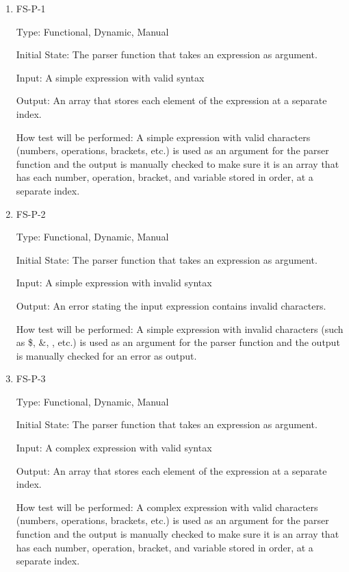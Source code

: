 \documentclass[12pt, titlepage]{article}
\begin{document}
\begin{enumerate}

\item{FS-P-1}

Type: Functional, Dynamic, Manual
					
Initial State: The parser function that takes an expression as argument.
					
Input: A simple expression with valid syntax
					
Output: An array that stores each element of the expression at a separate index.
					
How test will be performed: A simple expression with valid characters (numbers, operations, brackets, etc.) is used as an argument for the parser function and the output is manually checked to make sure it is an array that has each number, operation, bracket, and variable stored in order, at a separate index. 
					
\item{FS-P-2}

Type: Functional, Dynamic, Manual
					
Initial State: The parser function that takes an expression as argument.
					
Input: A simple expression with invalid syntax
					
Output: An error stating the input expression contains invalid characters.
					
How test will be performed: A simple expression with invalid characters (such as \$, \&, {}, etc.) is used as an argument for the parser function and the output is manually checked for an error as output. 

\item{FS-P-3}

Type: Functional, Dynamic, Manual
					
Initial State: The parser function that takes an expression as argument.
					
Input: A complex expression with valid syntax
					
Output: An array that stores each element of the expression at a separate index.
					
How test will be performed: A complex expression with valid characters (numbers, operations, brackets, etc.) is used as an argument for the parser function and the output is manually checked to make sure it is an array that has each number, operation, bracket, and variable stored in order, at a separate index.
\end{enumerate}
\end{document}

